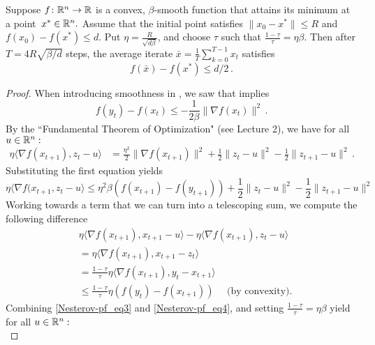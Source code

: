 \begin{lemma}
Suppose $f\colon\mathbb{R}^n\to\mathbb{R}$ is a convex, $\beta$-smooth function that attains its
minimum at a point~$x^*\in\mathbb{R}^n.$
Assume that the initial point satisfies $\|x_0-x^*\|\le R$ and $f(x_0)-f(x^*)\le
d.$ Put $\eta = \frac{R}{\sqrt{d\beta}}$, and choose
$\tau$ such that $\frac{1-\tau}{\tau} = \eta \beta$.
%
Then after $T = 4R\sqrt{\beta/d}$ steps, 
the average iterate $\bar{x} = \frac{1}{T} \sum_{k=0}^{T-1} x_t$ satisfies
\[
f(\bar{x})- f(x^*) \le d/2\,.
\]
\end{lemma}

\begin{proof}
When introducing smoothness in , we saw 
 that implies
\begin{equation}
\label{Nesterov-pf_smoothness_and_convexity}
f(y_t) - f(x_t) \leq -\frac{1}{2 \beta} \|\nabla f(x_t) \|^2\,.
\end{equation}
By the ``Fundamental Theorem of Optimization" (see Lecture 2), we have
for all $u\in\mathbb{R}^n:$
\begin{align}
\label{lecture7-nonsmooth}
\eta\langle \nabla f(x_{t+1}), z_t - u \rangle 
&= \frac{\eta^2}2\|\nabla f(x_{t+1})\|^2 
+ \frac12\|z_t - u \|^2 - \frac12\|z_{t+1} - u \|^2\,.
\end{align}
Substituting the first equation yields
\begin{equation}
\eta \langle \nabla f(x_{t+1}, z_t - u \rangle \leq \eta^2 \beta (f(x_{t+1}) -
f(y_{t+1})) + \frac12\|z_t - u\|^2 - \frac12\|z_{t+1} - u \|^2 \label{Nesterov-pf_eq3}
\end{equation}
\medskip
Working towards a term that we can turn into a telescoping sum, we compute the
following difference
\begin{align}
&\eta \langle \nabla f(x_{t+1}), x_{t+1} - u\rangle - \eta \langle \nabla
f(x_{t+1}), z_t - u\rangle \nonumber\\
&= \eta \langle\nabla f(x_{t+1}), x_{t+1} - z_t\rangle \nonumber\\
&= \frac{1-\tau}{\tau}  \eta \langle\nabla f(x_{t+1}), y_t - x_{t+1}\rangle \nonumber\\
&\leq \frac{1-\tau}{\tau} \eta (f(y_t) - f(x_{t+1})) \quad\text{ (by convexity)}. \label{Nesterov-pf_eq4}
\end{align}
\medskip
Combining  \eqref{Nesterov-pf_eq3} and \eqref{Nesterov-pf_eq4}, and setting
$\frac{1-\tau}{\tau} = \eta \beta$ yield for all $u\in\mathbb{R}^n:$
\begin{equation*}

\end{equation*}
\end{proof}
